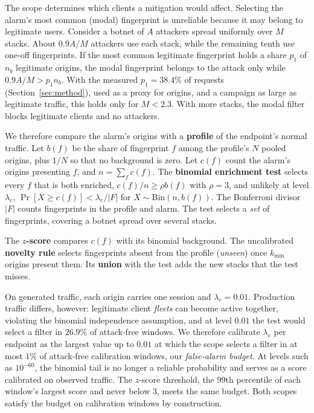 \documentclass[conference,letterpaper,10pt]{IEEEtran}
\newcommand\1{\textit{(i)}}
\newcommand\2{\textit{(ii)}}
\newcommand\3{\textit{(iii)}}
\newcommand\4{\textit{(iv)}}
\newcommand\5{\textit{(v)}}
\newcommand\6{\textit{(vi)}}
\newcommand\7{\textit{(vii)}}
\newcommand\8{\textit{(viii)}}
\newcommand\9{\textit{(ix)}}
\begin{document}
The scope determines which clients a mitigation would
affect. Selecting the alarm's most common (modal)
fingerprint is unreliable because it may belong to
legitimate users. Consider a botnet of $A$ attackers spread
uniformly over $M$ stacks. About $0.9A/M$ attackers use each
stack, while
the remaining tenth use one-off fingerprints. If the most
common legitimate fingerprint holds a share
$p_1$ of $n_b$ legitimate origins, the modal fingerprint
belongs to the attack only while $0.9A/M > p_1n_b$.
With the measured $p_1=38.4\%$ of requests
(Section~\ref{sec:method}), used as a proxy for origins,
and a campaign as large as legitimate traffic, this
holds only for $M<2.3$. With more stacks, the modal filter
blocks legitimate clients and no attackers.

We therefore compare the alarm's origins with a \textbf{profile} of
the endpoint's normal traffic.
Let $b(f)$ be the share of fingerprint $f$ among the
profile's $N$ pooled origins, plus $1/N$
so that no background is zero. Let
$c(f)$ count the alarm's origins presenting $f$, and
$n=\sum_f c(f)$. The \textbf{binomial enrichment test}
selects every $f$ that is both enriched, $c(f)/n \geq \rho
b(f)$ with $\rho=3$, and unlikely at level $\lambda_e$,
$\Pr[X\geq c(f)]<\lambda_e/|F|$ for
$X\sim\mathrm{Bin}(n,b(f))$. The Bonferroni divisor
$|F|$ counts fingerprints in the profile and alarm.
The test selects a \textit{set} of fingerprints, covering a botnet spread over several stacks.

The \textbf{$z$-score} compares $c(f)$ with its
binomial background. The uncalibrated \textbf{novelty rule} selects fingerprints absent from the profile (\textit{unseen}) once $k_{\min}$ origins present them. Its \textbf{union} with the test adds the new stacks that the test misses.

On generated traffic, each origin carries one session
and $\lambda_e=0.01$. Production traffic differs, however: legitimate client \textit{fleets} can become active together, violating the binomial independence assumption, and at level $0.01$ the test would select a filter in $26.9\%$ of attack-free windows.
We therefore calibrate $\lambda_e$ per endpoint as the
largest value up to $0.01$ at which the scope selects a
filter in at most $1\%$ of attack-free
calibration windows, our \textit{false-alarm budget}.
At levels such as $10^{-60}$, the binomial tail is no longer
a reliable probability and serves as a score calibrated on
observed traffic.
The $z$-score threshold, the 99th percentile of each
window's largest score and never below 3, meets the same
budget. Both scopes satisfy
the budget on calibration windows by construction.
\end{document}
